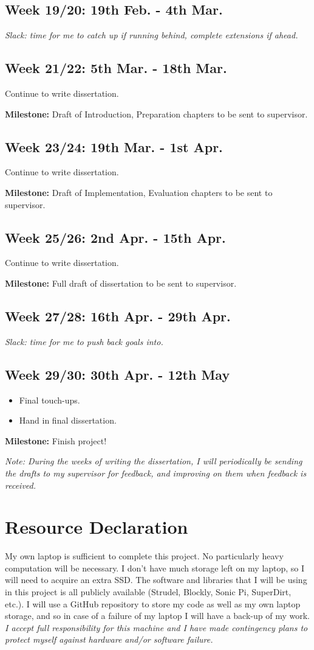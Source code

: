 \documentclass{article}
\begin{document}
\subsection*{Week 19/20: 19th Feb. - 4th Mar.}
\textit{Slack: time for me to catch up if running behind, complete extensions if ahead.}
\subsection*{Week 21/22: 5th Mar. - 18th Mar.}
Continue to write dissertation.

{
\centering\textbf{Milestone:} Draft of Introduction, Preparation chapters to be sent to supervisor.
}
\subsection*{Week 23/24: 19th Mar. - 1st Apr.}
Continue to write dissertation.
{

\centering\textbf{Milestone:} Draft of Implementation, Evaluation chapters to be sent to supervisor.
}
\subsection*{Week 25/26: 2nd Apr. - 15th Apr.}
Continue to write dissertation.

{
\centering\textbf{Milestone:} Full draft of dissertation to be sent to supervisor.
}
\subsection*{Week 27/28: 16th Apr. - 29th Apr.}
\textit{Slack: time for me to push back goals into.}
\subsection*{Week 29/30: 30th Apr. - 12th May}
\begin{itemize}
    \item Final touch-ups.
    \item Hand in final dissertation.
\end{itemize}
{
\centering\textbf{Milestone:} Finish project!
}

\textit{Note: During the weeks of writing the dissertation, I will periodically be sending the drafts to my supervisor for feedback, and improving on them when feedback is received.}
\section*{Resource Declaration}
My own laptop is sufficient to complete this project. No particularly heavy computation will be necessary. I don't have much storage left on my laptop, so I will need to acquire an extra SSD. The software and libraries that I will be using in this project is all publicly available (Strudel, Blockly, Sonic Pi, SuperDirt,  etc.). I will use a GitHub repository to store my code as well as my own laptop storage, and so in case of a failure of my laptop I will have a back-up of my work.
\textit{I accept full responsibility for this machine and I have made contingency plans to protect myself against hardware and/or software failure.}
\end{document}
